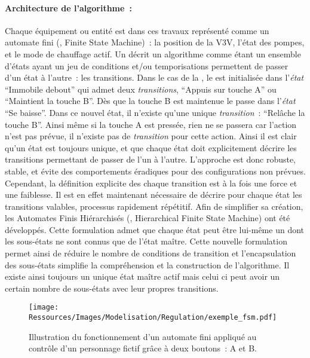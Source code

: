 \paragraph{Architecture de l’algorithme~:} %
\label{par:architecture_de_l_algorithme}
Chaque équipement ou entité est dans ces travaux représenté comme un automate fini (,
Finite State Machine)~: la position de la V3V, l’état des
pompes, et le mode de chauffage actif. Un  décrit un algorithme comme étant un
ensemble d’états ayant un jeu de conditions et/ou temporisations permettent de passer d’un
état à l’autre~: les transitions.
Dans le cas de la , le  est initialisée dans l’\textit{état}
\enquote{Immobile debout} qui admet deux \textit{transitions}, \enquote{Appuis sur touche A}
ou \enquote{Maintient la touche B}. Dès que la touche B est maintenue le 
passe dans l’\textit{état} \enquote{Se baisse}. Dans ce nouvel état, il n’existe qu’une
unique \textit{transition}~: \enquote{Relâche la touche B}. Ainsi même si la touche A
est pressée, rien ne se passera car l’action n’est pas prévue, il n’existe pas de \textit{transition}
pour cette action. Ainsi il est clair qu’un état est toujours unique, et que chaque état doit
explicitement décrire les transitions permettant de passer de l’un à l’autre.
L’approche est donc robuste, stable, et évite des comportements éradiques pour des configurations
non prévues.
Cependant, la définition explicite des chaque transition est à la fois une force et une faiblesse.
Il est en effet maintenant nécessaire de décrire pour chaque état les transitions
valables, processus rapidement répétitif.
Afin de simplifier sa création, les Automates Finis Hiérarchisés (, Hierarchical
Finite State Machine) ont été développés. Cette formulation admet que chaque état peut
être lui-même un  dont les sous-états ne sont connus que de l’état maître. Cette
nouvelle formulation permet ainsi de réduire le nombre de conditions de transition et
l’encapsulation des sous-états simplifie la compréhension et la construction de
l’algorithme. Il existe ainsi toujours un unique état maître actif mais celui ci peut avoir
un certain nombre de sous-états avec leur propres transitions.

\begin{figure}
    \centering
    \texttt{[image: Ressources/Images/Modelisation/Regulation/exemple\_fsm.pdf]}
    \caption[Illustration du fonctionnement d’un automate fini]
            {Illustration du fonctionnement d’un automate fini appliqué au contrôle
             d’un personnage fictif grâce à deux boutons~: A et B.}
    \label{fig:automate_fini}
\end{figure}

